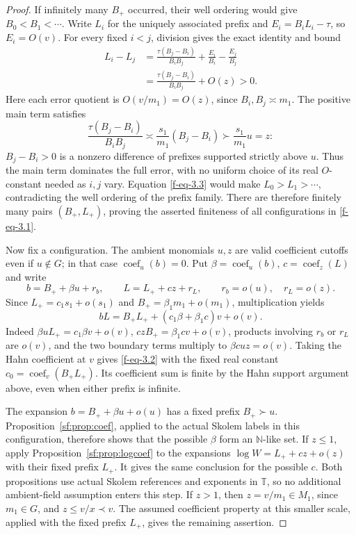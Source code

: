 \documentclass[11pt]{article}
\theoremstyle{definition}
\theoremstyle{remark}
\newcommand{\N}{\mathbb N}
\newcommand{\T}{\mathbb T}
\newcommand{\arch}{\mathrel{\asymp}}
\DeclareMathOperator{\coef}{coef}
\numberwithin{equation}{section}
\begin{document}
\begin{proof}
If infinitely many $B_+$ occurred, their well ordering would give
$B_0<B_1<\cdots$.  Write $L_i$ for the uniquely associated prefix
and $E_i=B_iL_i-\tau$, so $E_i=O(v)$.
For every fixed $i<j$, division gives the exact identity and bound
\begin{equation}
 \begin{split}
 L_i-L_j
 &=\frac{\tau(B_j-B_i)}{B_iB_j}
                  +\frac{E_i}{B_i}-\frac{E_j}{B_j}\\
 &=\frac{\tau(B_j-B_i)}{B_iB_j}+O(z)>0.
 \end{split}
 \label{f-eq-3.3}
\end{equation}
Here each error quotient is $O(v/m_1)=O(z)$, since
$B_i,B_j\arch m_1$.  The positive main term satisfies
\[
 \frac{\tau(B_j-B_i)}{B_iB_j}
 \arch\frac{s_1}{m_1}(B_j-B_i)
 \succ\frac{s_1}{m_1}u=z:
\]
$B_j-B_i>0$ is a nonzero difference of prefixes supported
strictly above $u$.  Thus the main term dominates the full error,
with no uniform choice of its real $O$-constant needed as $i,j$
vary.  Equation \eqref{f-eq-3.3} would make $L_0>L_1>\cdots$,
contradicting the well ordering of the prefix family.  There are
therefore finitely many pairs $(B_+,L_+)$, proving the asserted
finiteness of all configurations in \eqref{f-eq-3.1}.

Now fix a configuration.  The ambient monomials $u,z$ are valid
coefficient cutoffs even if $u\notin G$; in that case
$\coef_u(b)=0$.  Put
$\beta=\coef_u(b)$, $c=\coef_z(L)$ and write
\[
 b=B_++\beta u+r_b,\qquad
 L=L_++cz+r_L,\qquad r_b=o(u),\quad r_L=o(z).
\]
Since
$L_+=c_1s_1+o(s_1)$ and
$B_+=\beta_1m_1+o(m_1)$, multiplication yields
\[
 bL=B_+L_++(c_1\beta+\beta_1c)v+o(v).
\]
Indeed $\beta uL_+=c_1\beta v+o(v)$,
$czB_+=\beta_1cv+o(v)$, products involving $r_b$ or $r_L$
are $o(v)$, and the two boundary terms multiply to
$\beta c uz=o(v)$.  Taking the Hahn coefficient at $v$ gives
\eqref{f-eq-3.2} with the fixed real constant
$c_0=\coef_v(B_+L_+)$.  Its coefficient sum is finite by the
Hahn support argument above, even when either prefix is infinite.

The expansion $b=B_++\beta u+o(u)$ has a fixed prefix
$B_+\succ u$. Proposition~\ref{sf:prop:coef}, applied to the
actual Skolem labels in this configuration, therefore shows that
the possible $\beta$ form an $\N$-like set.
If $z\le1$, apply Proposition~\ref{sf:prop:logcoef} to the
expansions $\log W=L_++cz+o(z)$ with their fixed prefix $L_+$.
It gives the same conclusion for the possible $c$.
Both propositions use actual Skolem references and exponents in $\T$,
so no additional ambient-field assumption enters this step.
If $z>1$, then $z=v/m_1\in M_1$, since $m_1\in G$, and
$z\le v/x\prec v$.  The assumed coefficient property at this
smaller scale, applied with the fixed prefix $L_+$, gives the
remaining assertion.
\end{proof}
\end{document}
